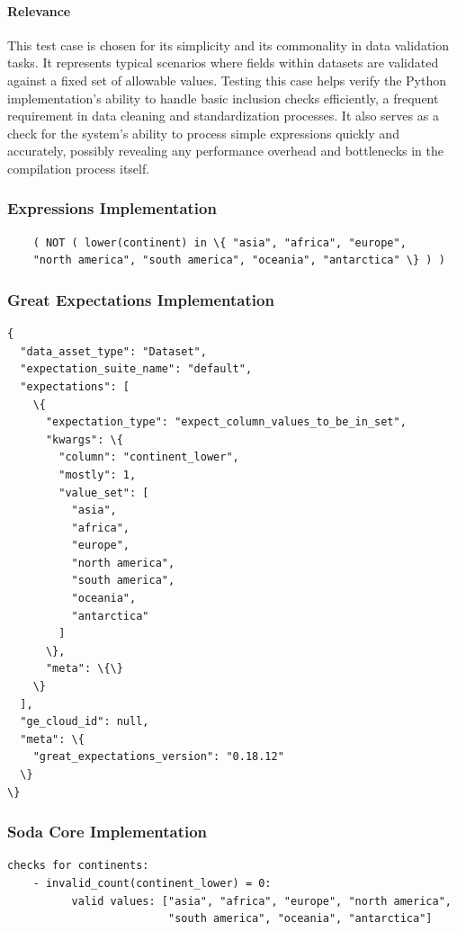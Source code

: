 \paragraph{Relevance} This test case is chosen for its simplicity and its commonality in data validation tasks. It represents typical scenarios where fields within datasets are validated against a fixed set of allowable values. Testing this case helps verify the Python implementation’s ability to handle basic inclusion checks efficiently, a frequent requirement in data cleaning and standardization processes. It also serves as a check for the system’s ability to process simple expressions quickly and accurately, possibly revealing any performance overhead and bottlenecks in the compilation process itself.

\subsubsection{Expressions Implementation}

\begin{verbatim}
    ( NOT ( lower(continent) in \{ "asia", "africa", "europe", 
    "north america", "south america", "oceania", "antarctica" \} ) )
\end{verbatim}

\subsubsection{Great Expectations Implementation}

\begin{verbatim}
{
  "data_asset_type": "Dataset",
  "expectation_suite_name": "default",
  "expectations": [
    \{
      "expectation_type": "expect_column_values_to_be_in_set",
      "kwargs": \{
        "column": "continent_lower",
        "mostly": 1,
        "value_set": [
          "asia",
          "africa",
          "europe",
          "north america",
          "south america",
          "oceania",
          "antarctica"
        ]
      \},
      "meta": \{\}
    \}
  ],
  "ge_cloud_id": null,
  "meta": \{
    "great_expectations_version": "0.18.12"
  \}
\}
\end{verbatim}

\subsubsection{Soda Core Implementation}

\begin{verbatim}
checks for continents:
    - invalid_count(continent_lower) = 0:
          valid values: ["asia", "africa", "europe", "north america", 
                         "south america", "oceania", "antarctica"]
\end{verbatim}


